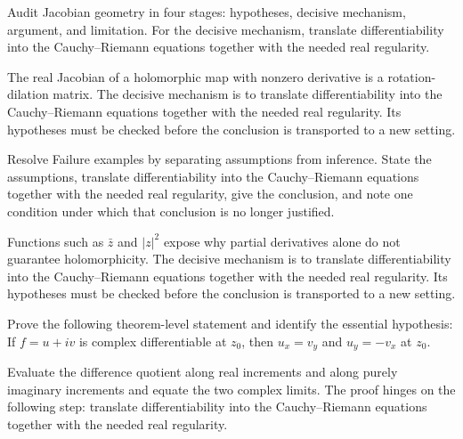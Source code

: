 \begin{problem}\label{prob:iv02-problem-07}
Audit Jacobian geometry in four stages: hypotheses, decisive mechanism, argument, and limitation. For the decisive mechanism, translate differentiability into the Cauchy--Riemann equations together with the needed real regularity.
\end{problem}
\begin{solution}
The real Jacobian of a holomorphic map with nonzero derivative is a rotation-dilation matrix. The decisive mechanism is to translate differentiability into the Cauchy--Riemann equations together with the needed real regularity. Its hypotheses must be checked before the conclusion is transported to a new setting.
\end{solution}

\begin{problem}\label{prob:iv02-problem-08}
Resolve Failure examples by separating assumptions from inference. State the assumptions, translate differentiability into the Cauchy--Riemann equations together with the needed real regularity, give the conclusion, and note one condition under which that conclusion is no longer justified.
\end{problem}
\begin{solution}
Functions such as $\bar z$ and $|z|^2$ expose why partial derivatives alone do not guarantee holomorphicity. The decisive mechanism is to translate differentiability into the Cauchy--Riemann equations together with the needed real regularity. Its hypotheses must be checked before the conclusion is transported to a new setting.
\end{solution}

\begin{problem}\label{prob:iv02-problem-09}
Prove the following theorem-level statement and identify the essential hypothesis: If $f=u+iv$ is complex differentiable at $z_0$, then $u_x=v_y$ and $u_y=-v_x$ at $z_0$.
\end{problem}
\begin{solution}
Evaluate the difference quotient along real increments and along purely imaginary increments and equate the two complex limits. The proof hinges on the following step: translate differentiability into the Cauchy--Riemann equations together with the needed real regularity.
\end{solution}

